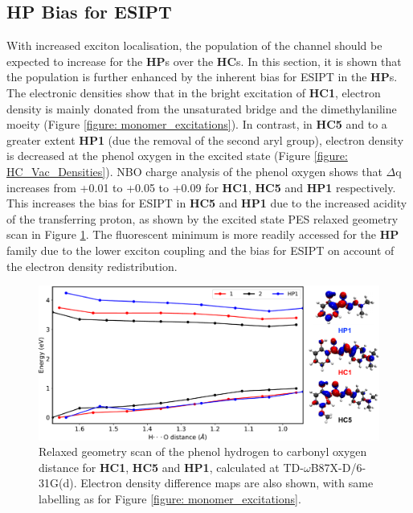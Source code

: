 \subsection{\textbf{HP} Bias for ESIPT}\label{section: Connecting_Bias}
With increased exciton localisation, the population of the \Kstar{} channel should be expected to increase for the \textbf{HP}s over the \textbf{HC}s. In this section, it is shown that the \Kstar{} population is further enhanced by the inherent bias for ESIPT in the \textbf{HP}s. The electronic densities show that in the bright excitation of \textbf{HC1}, electron density is mainly donated from the unsaturated bridge and the dimethylaniline moeity (Figure \ref{figure: monomer_excitations}). In contrast, in \textbf{HC5} and to a greater extent \textbf{HP1} (due the removal of the second aryl group), electron density is decreased at the phenol oxygen in the excited state (Figure \ref{figure: HC_Vac_Densities}). NBO charge analysis of the phenol oxygen shows that $\Delta$q increases from +0.01 to +0.05 to +0.09 for \textbf{HC1}, \textbf{HC5} and \textbf{HP1} respectively. This increases the bias for ESIPT in \textbf{HC5} and \textbf{HP1} due to the increased acidity of the transferring proton, as shown by the excited state PES relaxed geometry scan in Figure \ref{figure: Hscan}. The fluorescent \Kstar{} minimum is more readily accessed for the \textbf{HP} family due to the lower exciton coupling and the bias for ESIPT on account of the electron density redistribution.


\begin{figure}[H]
\centering
  \includegraphics[width=0.8\linewidth]{5ConnectingCrystalStructure/Hscan}
  \caption[Relaxed geometry scan for ESIPT process.]{Relaxed geometry scan of the phenol hydrogen to carbonyl oxygen distance for \textbf{HC1}, \textbf{HC5} and \textbf{HP1}, calculated at TD-$\omega$B87X-D/6-31G(d). Electron density difference maps are also shown, with same labelling as for Figure \ref{figure: monomer_excitations}.}
  \label{figure: Hscan}
\end{figure}

